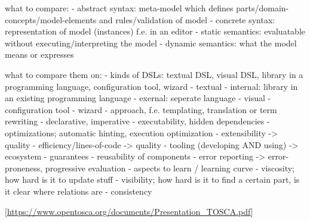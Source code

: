 what to compare:
- abstract syntax: meta-model which defines parts/domain-concepts/model-elements and rules/validation of model
- concrete syntax: representation of model (instances) f.e. in an editor
- static semantics: evaluatable without executing/interpreting the model
- dynamic semantics: what the model means or expresses

what to compare them on:
- kinds of DSLs: textual DSL, visual DSL, library in a programming language, configuration tool, wizard
  - textual
    - internal: library in an existing programming language
    - exernal: seperate language
  - visual
    - configuration tool
    - wizard
- approach, f.e. templating, translation or term rewriting
  - declarative, imperative
- executability, hidden dependencies
- optimizations; automatic hinting, execution optimization
- extensibility -> quality
- efficiency/lines-of-code -> quality
- tooling (developing AND using) -> ecosystem
- guarantees
- reusability of components
- error reporting -> error-proneness, progressive evaluation
- aspects to learn / learning curve
- viscosity; how hard is it to update stuff
- visibility; how hard is it to find a certain part, is it clear where relations are
- consistency


[\url{https://www.opentosca.org/documents/Presentation\_TOSCA.pdf}]

